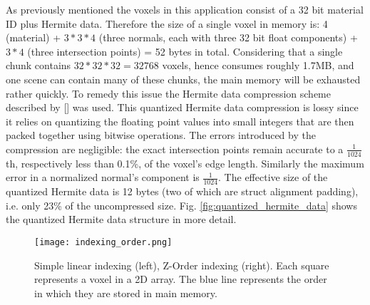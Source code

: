 As previously mentioned the voxels in this application consist of a 32 bit material ID plus Hermite data. Therefore the size of a single voxel in memory is: 4 (material) + $3*3*4$ (three normals, each with three 32 bit float components) + $3*4$ (three intersection points) = 52 bytes in total. Considering that a single chunk contains $32 * 32 * 32 = 32768$ voxels, hence consumes roughly 1.7MB, and one scene can contain many of these chunks,
the main memory will be exhausted rather quickly.
To remedy this issue the Hermite data compression scheme described by [] was used.
This quantized Hermite data compression is lossy since it relies on quantizing the floating point values into small integers that are then packed together using bitwise operations. The errors introduced by the compression are
negligible: the exact intersection points remain accurate to a $\frac{1}{1024}$th, respectively less than 0.1\%, of the voxel's edge length. Similarly the maximum error in a normalized normal's component is $\frac{1}{1024}$.
The effective size of the quantized Hermite data is 12 bytes (two of which are struct alignment padding), i.e. only 23\% of the uncompressed size. Fig. \ref{fig:quantized_hermite_data} shows the quantized Hermite data
structure in more detail.\\

\begin{wrapfigure}{R}{0.4\textwidth}
\texttt{[image: indexing\_order.png]}
\caption{Simple linear indexing (left), Z-Order indexing (right). Each square represents a voxel in a 2D array. The blue line represents the order in which they are stored in main memory.}
\label{fig:indexing_order}
\end{wrapfigure}

